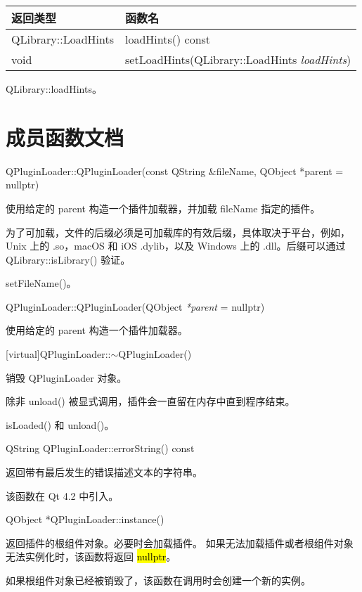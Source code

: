 \begin{tabular}{|l|l|}
\hline
返回类型& 	函数名\\
\hline
QLibrary::LoadHints	& loadHints() const \\ 
\hline
void & setLoadHints(QLibrary::LoadHints \emph{loadHints}) \\
\hline
\end{tabular}

\begin{seeAlso}
QLibrary::loadHints。
\end{seeAlso}

\section{成员函数文档}


QPluginLoader::QPluginLoader(const QString \&fileName, QObject *parent = nullptr)

使用给定的 parent 构造一个插件加载器，并加载 fileName 指定的插件。

为了可加载，文件的后缀必须是可加载库的有效后缀，具体取决于平台，例如，Unix 上的 .so，macOS 和 iOS .dylib，以及 Windows 上的 .dll。后缀可以通过 QLibrary::isLibrary() 验证。

\begin{seeAlso}
setFileName()。
\end{seeAlso}

QPluginLoader::QPluginLoader(QObject \emph{*parent} = nullptr)

使用给定的 parent 构造一个插件加载器。

[virtual]QPluginLoader::$\sim$QPluginLoader()

销毁 QPluginLoader 对象。

除非 unload() 被显式调用，插件会一直留在内存中直到程序结束。

\begin{seeAlso}
isLoaded() 和 unload()。
\end{seeAlso}

QString QPluginLoader::errorString() const

返回带有最后发生的错误描述文本的字符串。

该函数在 Qt 4.2 中引入。

QObject *QPluginLoader::instance()

返回插件的根组件对象。必要时会加载插件。
如果无法加载插件或者根组件对象无法实例化时，该函数将返回 \hl{nullptr}。

如果根组件对象已经被销毁了，该函数在调用时会创建一个新的实例。

